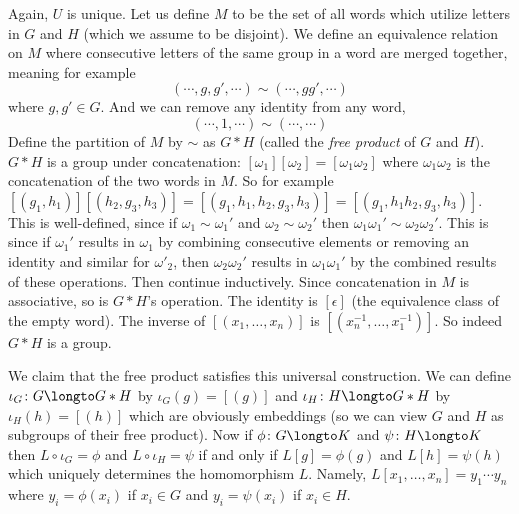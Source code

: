 \medskip
\centerline{\def\diagcolwidth{1cm}\def\diagrowheight{.75cm}}

Again, $U$ is unique.
Let us define $M$ to be the set of all words which utilize letters in $G$ and $H$ (which we assume to be disjoint).
We define an equivalence relation on $M$ where consecutive letters of the same group in a word are merged together, meaning for example
$$ (\cdots,g,g',\cdots) \sim (\cdots,gg',\cdots) $$
where $g,g'\in G$.
And we can remove any identity from any word,
$$ (\cdots,1,\cdots) \sim (\cdots,\cdots) $$
Define the partition of $M$ by $\sim$ as $G*H$ (called the {\it free product} of $G$ and $H$).
$G*H$ is a group under concatenation: $[\omega_1][\omega_2]=[\omega_1\omega_2]$ where $\omega_1\omega_2$ is the concatenation of the two words in $M$.
So for example $[(g_1,h_1)][(h_2,g_3,h_3)]=[(g_1,h_1,h_2,g_3,h_3)]=[(g_1,h_1h_2,g_3,h_3)]$.
This is well-defined, since if $\omega_1\sim\omega_1'$ and $\omega_2\sim\omega_2'$ then $\omega_1\omega_1'\sim\omega_2\omega_2'$.
This is since if $\omega_1'$ results in $\omega_1$ by combining consecutive elements or removing an identity and similar for $\omega'_2$, then $\omega_2\omega_2'$ results in $\omega_1\omega_1'$ by the
combined results of these operations.
Then continue inductively.
Since concatenation in $M$ is associative, so is $G*H$'s operation.
The identity is $[\epsilon]$ (the equivalence class of the empty word).
The inverse of $[(x_1,\dots,x_n)]$ is $[(x_n^{-1},\dots,x_1^{-1})]$.
So indeed $G*H$ is a group.

We claim that the free product satisfies this universal construction.
We can define $\iota_G\colon G\longto G*H$ by $\iota_G(g)=[(g)]$ and $\iota_H\colon H\longto G*H$ by $\iota_H(h)=[(h)]$ which are obviously embeddings (so we can view $G$ and $H$ as subgroups of their free
product).
Now if $\phi\colon G\longto K$ and $\psi\colon H\longto K$ then $L\circ\iota_G=\phi$ and $L\circ\iota_H=\psi$ if and only if $L[g]=\phi(g)$ and $L[h]=\psi(h)$ which uniquely determines the homomorphism $L$.
Namely, $L[x_1,\dots,x_n]=y_1\cdots y_n$ where $y_i=\phi(x_i)$ if $x_i\in G$ and $y_i=\psi(x_i)$ if $x_i\in H$.
